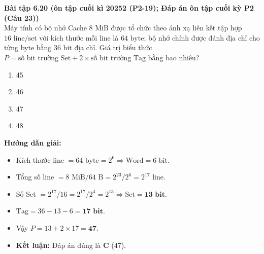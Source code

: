 \textbf{Bài tập 6.20 (ôn tập cuối kì 20252 (P2-19); Đáp án ôn tập cuối kỳ P2 (Câu 23))}\\
Máy tính có bộ nhớ Cache $8\text{ MiB}$ được tổ chức theo ánh xạ liên kết tập hợp $16\text{ line/set}$ với kích thước mỗi line là $64\text{ byte}$; bộ nhớ chính được đánh địa chỉ cho từng byte bằng $36\text{ bit}$ địa chỉ. Giá trị biểu thức $P = \text{số bit trường Set} + 2 \times \text{số bit trường Tag}$ bằng bao nhiêu?
\begin{enumerate}[label=\Alph*.]
    \item 45
    \item 46
    \item 47
    \item 48
\end{enumerate}
\textbf{Hướng dẫn giải:}
\begin{itemize}
    \item Kích thước line $= 64\text{ byte} = 2^6 \Rightarrow \text{Word} = 6\text{ bit}$.
    \item Tổng số line $= 8\text{ MiB} / 64\text{ B} = 2^{23} / 2^6 = 2^{17}$ line.
    \item Số Set $= 2^{17} / 16 = 2^{17} / 2^4 = 2^{13} \Rightarrow \text{Set} = \mathbf{13\text{ bit}}$.
    \item $\text{Tag} = 36 - 13 - 6 = \mathbf{17\text{ bit}}$.
    \item Vậy $P = 13 + 2 \times 17 = \mathbf{47}$.
    \item \textbf{Kết luận:} Đáp án đúng là \textbf{C} (47).
\end{itemize}

